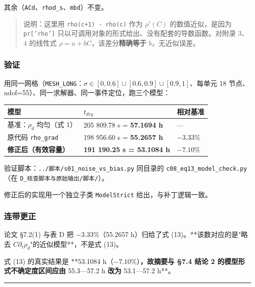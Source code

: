 其余（\texttt{ACd}、\texttt{rhod\_s}、\texttt{mbd}）不变。


\begin{quote}
说明：这里用 \texttt{rho(c+1) - rho(c)} 作为 $\rho'(C)$ 的数值近似，是因为 \texttt{pr['rho']} 只以可调用对象的形式给出、没有配套的导数函数。对附录 3、4 的线性式 $\rho=a+bC$，该差分\textbf{精确等于} $b$，无近似误差。
\end{quote}


\subsubsection{验证}


用同一网格（\texttt{MESH\_LONG}：$\sigma\in[0,0.6]\cup[0.6,0.9]\cup[0.9,1]$、每单元 18 节点、ndof=55）、同一求解器、同一事件定位，跑三个模型：


\begin{center}
\small
\begin{tabular}{lll}
\toprule
模型 & $t_{dry}$ & 相对基准 \\
\midrule
基准：$\rho_d$ 均匀（式 1） & 205 809.78 s = \textbf{57.1694 h} & — \\
原代码 \texttt{rho\_grad} & 198 956.60 s = \textbf{55.2657 h} & $-3.33\%$ \\
\textbf{修正后（有效容量）} & \textbf{191 190.25 s = 53.1084 h} & $\mathbf{-7.10\%}$ \\
\bottomrule
\end{tabular}
\end{center}


验证脚本：\texttt{../脚本/s01\_noise\_vs\_bias.py} 同目录的 \texttt{c08\_eq13\_model\_check.py}（在 \texttt{D\_核查脚本与原始输出/脚本/}）。

修正后的实现用一个独立子类 \texttt{ModelStrict} 给出，与补丁逻辑一致。


\subsubsection{连带更正}


论文 §7.2(1) 与表 D 把 $-3.33\%$（55.2657 h）归给了式 (13)。**该数对应的是"略去 $C\partial_t\rho_d$"的近似模型**，不是式 (13)。

式 (13) 的真实结果是 **53.1084 h（$-7.10\%$）\textbf{，故摘要与 §7.4 结论 2 的模型形式不确定度区间应由 }55.3—57.2 h\textbf{ 改为 }53.1—57.2 h**。


\vspace{1mm}\hrule\vspace{1mm}



